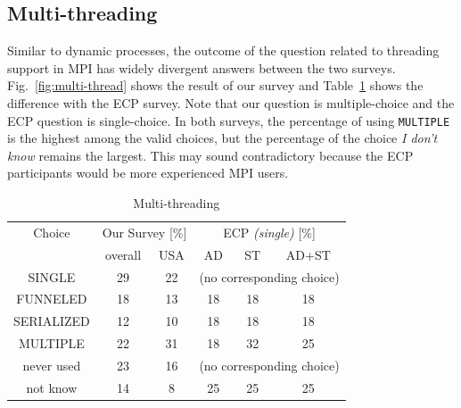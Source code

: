 \documentclass[preprint,5p,times]{elsarticle}
\def\myquote#1{{\it #1}}
\begin{document}

\subsection{Multi-threading}\label{sec:mutil-threading}

Similar to dynamic processes, the outcome of the question related to threading
support in MPI has widely divergent answers between the two surveys.
Fig.~\ref{fig:multi-thread} shows the result of our survey and
Table~\ref{tab:multi-thread} shows the difference with the ECP survey. Note that
our question is multiple-choice and the ECP question is single-choice. In both
surveys, the percentage of using {\tt MULTIPLE} is the highest among the valid
choices, but the percentage of the choice \myquote{I don't know} remains the
largest. This may sound contradictory because the ECP participants would be more
experienced MPI users.

\begin{table}[htb]%
  \small%
  \begin{center}%
    \caption{Multi-threading}\label{tab:multi-thread}%
    \begin{tabular}{c||c|c||c|c|c}%
      \hline%
      Choice & \multicolumn{2}{c||}{Our Survey [\%]} &
      \multicolumn{3}{c}{ECP {\it(single)} [\%]} \\
      \cline{2-6}%
      & overall & USA & AD & ST & AD+ST \\
      \hline%
      SINGLE & 29 & 22 & \multicolumn{3}{c}{\scriptsize (no corresponding choice)} \\
      FUNNELED & 18 & 13 & 18 & 18 & 18 \\
      SERIALIZED & 12 & 10 & 18 & 18 & 18 \\
      MULTIPLE & 22 & 31 & 18 & 32 & 25 \\
      never used & 23 & 16 & \multicolumn{3}{c}{\scriptsize (no corresponding choice)} \\
      not know & 14 & 8 & 25 & 25 & 25\\
      \hline%
    \end{tabular}%
  \end{center}%
\end{table}%
\end{document}
